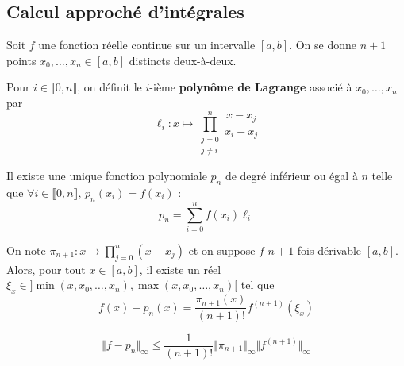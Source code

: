   \subsection{Calcul approché d'intégrales}


  Soit $f$ une fonction réelle continue sur un intervalle $[a,b]$. On se donne $n+1$ points $x_0, \dots, x_n \in [a,b]$ distincts deux-à-deux.

  \begin{definition}
    Pour $i \in \llbracket 0, n \rrbracket$, on définit le $i$-ième \textbf{polynôme de Lagrange} associé à $x_0, \dots, x_n$ par
    \[ \ell_i : x \mapsto \prod_{\substack{j=0\\j \neq i}}^n \frac{x-x_j}{x_i-x_j} \]
  \end{definition}

  \begin{theorem}
    Il existe une unique fonction polynomiale $p_n$ de degré inférieur ou égal à $n$ telle que $\forall i \in \llbracket 0, n \rrbracket, \, p_n(x_i) = f(x_i)$ :
    \[ p_n = \sum_{i=0}^n f(x_i) \ell_i \]
  \end{theorem}

  \begin{theorem}
    On note $\pi_{n+1} : x \mapsto \prod_{j=0}^{n} (x-x_j)$ et on suppose $f$ $n+1$ fois dérivable $[a,b]$. Alors, pour tout $x \in [a,b]$, il existe un réel $\xi_x \in ]\min(x,x_0,\dots,x_n),\max(x,x_0,\dots,x_n)[$ tel que
    \[ f(x)-p_n(x) = \frac{\pi_{n+1}(x)}{(n+1)!} f^{(n+1)}(\xi_x) \]
  \end{theorem}

  \begin{corollary}
    \[ \Vert f - p_n \Vert_\infty \leq \frac{1}{(n+1)!} \Vert \pi_{n+1} \Vert_\infty \Vert f^{(n+1)} \Vert_\infty \]
  \end{corollary}


